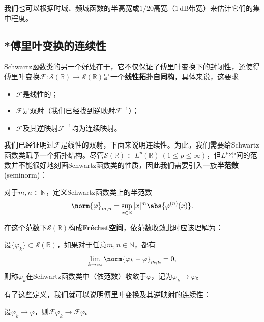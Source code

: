 我们也可以根据时域、频域函数的半高宽或$1/20$高宽（$1\,\mathrm{dB}$带宽）来估计它们的集中程度。

\subsection{*傅里叶变换的连续性}\label{sub:fourier_continuous}
Schwartz函数类的另一个好处在于，它不仅保证了傅里叶变换下的封闭性，还使得傅里叶变换$\mathcal{F}:\mathcal{S}(\mathbb{R})\to\mathcal{S}(\mathbb{R})$是一个\textbf{线性拓扑自同构}，具体来说，这要求
\begin{itemize}
    \item $\mathcal{F}$是线性的；
    \item $\mathcal{F}$是双射（我们已经找到逆映射$\mathcal{F}^{-1}$）；
    \item $\mathcal{F}$及其逆映射$\mathcal{F}^{-1}$均为连续映射。
\end{itemize}
我们已经证明过$\mathcal{F}$是线性的双射，下面来说明连续性。为此，我们需要给Schwartz函数类赋予一个拓扑结构。尽管$\mathcal{S}(\mathbb{R})\subset L^p(\mathbb{R})\ (1\leq p\leq\infty)$，但$L^p$空间的范数并不能很好地刻画Schwartz函数类的性质，因此我们需要引入一族\textbf{半范数}(seminorm)：
\begin{definition}[*Schwartz函数类的半范数]
    对于$m,n\in\mathbb{N}$，定义Schwartz函数类上的半范数
    \begin{equation}
        \norm{\varphi}_{m,n}=\sup_{x\in\mathbb{R}}|x|^m\abs{\varphi^{(n)}(x)}.
    \end{equation}
\end{definition}
在这个范数下$\mathcal{S}(\mathbb{R})$构成\textbf{Fréchet空间}，依范数收敛此时应该理解为：
\begin{definition}[*Schwartz函数类中的收敛]
    设$\{\varphi_k\}\subset\mathcal{S}(\mathbb{R})$，如果对于任意$m,n\in\mathbb{N}$，都有
    \begin{equation}
        \lim_{k\to\infty}\norm{\varphi_k-\varphi}_{m,n}=0,
    \end{equation}
    则称$\varphi_k$在Schwartz函数类中（依范数）收敛于$\varphi$，记为$\varphi_k\to \varphi$。
\end{definition}
有了这些定义，我们就可以说明傅里叶变换及其逆映射的连续性：
\begin{theorem}
    设$\varphi_k\to \varphi$，则$\mathcal{F}\varphi_k\to \mathcal{F}\varphi$。
\end{theorem}
